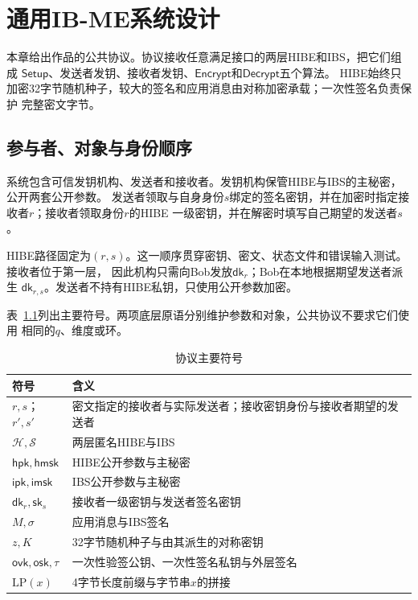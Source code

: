 \chapter{通用IB-ME系统设计}

本章给出作品的公共协议。协议接收任意满足接口的两层HIBE和IBS，把它们组成
$\mathsf{Setup}$、发送者发钥、接收者发钥、$\mathsf{Encrypt}$和$\mathsf{Decrypt}$五个算法。
HIBE始终只加密32字节随机种子，较大的签名和应用消息由对称加密承载；一次性签名负责保护
完整密文字节。

\section{参与者、对象与身份顺序}

系统包含可信发钥机构、发送者和接收者。发钥机构保管HIBE与IBS的主秘密，公开两套公开参数。
发送者领取与自身身份$s$绑定的签名密钥，并在加密时指定接收者$r$；接收者领取身份$r$的HIBE
一级密钥，并在解密时填写自己期望的发送者$s$。

HIBE路径固定为$(r,s)$。这一顺序贯穿密钥、密文、状态文件和错误输入测试。接收者位于第一层，
因此机构只需向Bob发放$\mathsf{dk}_r$；Bob在本地根据期望发送者派生
$\mathsf{dk}_{r,s}$。发送者不持有HIBE私钥，只使用公开参数加密。

表~\ref{tab:notations}列出主要符号。两项底层原语分别维护参数和对象，公共协议不要求它们使用
相同的$q$、维度或环。

\begin{table}[H]
\centering\small
\caption{协议主要符号}
\label{tab:notations}
\begin{tabularx}{\textwidth}{@{}p{}X@{}}
\toprule
\rowcolor{black!8} 符号 & 含义 \\
\midrule
$r,s$；$r',s'$ & 密文指定的接收者与实际发送者；接收密钥身份与接收者期望的发送者 \\
$\mathcal H,\mathcal S$ & 两层匿名HIBE与IBS \\
$\mathsf{hpk},\mathsf{hmsk}$ & HIBE公开参数与主秘密 \\
$\mathsf{ipk},\mathsf{imsk}$ & IBS公开参数与主秘密 \\
$\mathsf{dk}_r,\mathsf{sk}_s$ & 接收者一级密钥与发送者签名密钥 \\
$M,\sigma$ & 应用消息与IBS签名 \\
$z,K$ & 32字节随机种子与由其派生的对称密钥 \\
$\mathsf{ovk},\mathsf{osk},\tau$ & 一次性验签公钥、一次性签名私钥与外层签名 \\
$\mathrm{LP}(x)$ & 4字节长度前缀与字节串$x$的拼接 \\
\bottomrule
\end{tabularx}
\end{table}

